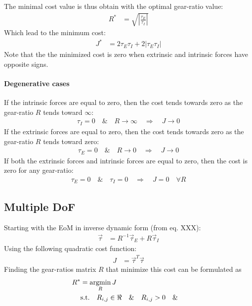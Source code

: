 The minimal cost value is thus obtain with the optimal gear-ratio value:
%
\begin{align}
R^*    &= \sqrt{ \left| \frac{\tau_E}{\tau_I} \right|} 
\end{align}
%
Which lead to the minimum cost:
%
\begin{align}
J^*    &=  2 \tau_E \tau_I  + 2 \left| \tau_E \tau_I \right| 
\end{align}
%
Note that the the minimized cost is zero when extrinsic and intrinsic forces have opposite signs.

\paragraph{Degenerative cases}
If the intrinsic forces are equal to zero, then the cost tends towards zero as the gear-ratio $R$ tends toward $\infty$:
%
\begin{align}
\tau_I = 0 \quad \& \quad R \rightarrow \infty \quad \Rightarrow \quad J \rightarrow 0
\end{align}
%
If the extrinsic forces are equal to zero, then the cost tends towards zero as the gear-ratio $R$ tends toward zero:
%
\begin{align}
\tau_E = 0 \quad \& \quad R \rightarrow 0 \quad \Rightarrow \quad J \rightarrow 0
\end{align}
%
If both the extrinsic forces and intrinsic forces are equal to zero, then the cost is zero for any gear-ratio:
%
\begin{align}
\tau_E = 0 \quad \& \quad \tau_I = 0 \quad \Rightarrow \quad J = 0  \quad \forall R
\end{align}
%


\subsection{Multiple DoF}
\label{sec:optgearproofn}

Starting with the EoM in inverse dynamic form (from eq. XXX):
%
\begin{align}
\vec{ \tau } &=  R^{-1} \vec{\tau}_E + R \vec{\tau}_I
\end{align}
%
Using the following quadratic cost function:
%
\begin{align}
J &=  \vec{ \tau }^T \vec{ \tau }
\end{align}
%
Finding the gear-ratios matrix $R$ that minimize this cost can be formulated as
%
\begin{align}
R^* &=  \operatornamewithlimits{argmin}\limits_{R} J \\
    &   \text{s.t.} \quad R_{i,j} \in \Re  \quad \& \quad R_{i,j} > 0  \quad \& \quad 
\end{align}
%

